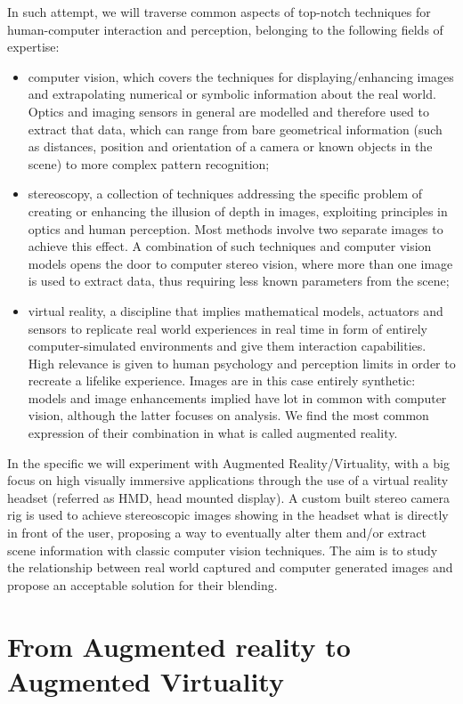 In such attempt, we will traverse common aspects of top-notch techniques for human-computer interaction and perception, belonging to the following fields of expertise:
\begin{itemize}
\item computer vision, which covers the techniques for displaying/enhancing images and extrapolating numerical or symbolic information about the real world. Optics and imaging sensors in general are modelled and therefore used to extract that data, which can range from bare geometrical information (such as distances, position and orientation of a camera or known objects in the scene) to more complex pattern recognition;
\item stereoscopy, a collection of techniques addressing the specific problem of creating or enhancing the illusion of depth in images, exploiting principles in optics and human perception. Most methods involve two separate images to achieve this effect. A combination of such techniques and computer vision models opens the door to computer stereo vision, where more than one image is used to extract data, thus requiring less known parameters from the scene;
\item virtual reality, a discipline that implies mathematical models, actuators and sensors to replicate real world experiences in real time in form of entirely computer-simulated environments and give them interaction capabilities. High relevance is given to human psychology and perception limits in order to recreate a lifelike experience. Images are in this case entirely synthetic: models and image enhancements implied have lot in common with computer vision, although the latter focuses on analysis. We find the most common expression of their combination in what is called augmented reality.
\end{itemize}

In the specific we will experiment with Augmented Reality/Virtuality, with a big focus on high visually immersive applications through the use of a virtual reality headset (referred as HMD, head mounted display). A custom built stereo camera rig is used to achieve stereoscopic images showing in the headset what is directly in front of the user, proposing a way to eventually alter them and/or extract scene information with classic computer vision techniques. The aim is to study the relationship between real world captured and computer generated images and propose an acceptable solution for their blending.

\section{From Augmented reality to Augmented Virtuality}

